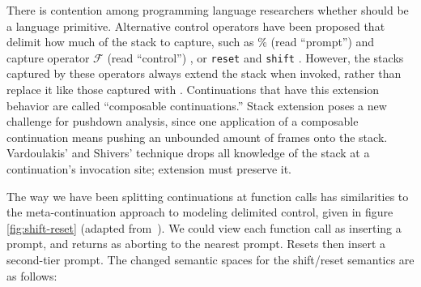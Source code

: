 There is contention among programming language researchers whether  should be a language primitive\citep{ianjohnson:kiselyov:against-callcc}.
%
Alternative control operators have been proposed that delimit how much of the stack to capture, such as $\%$ (read ``prompt'') and capture operator ${\mathcal F}$ (read ``control'') \citep{ianjohnson:felleisen:control:1988}, or \texttt{reset} and \texttt{shift} \citep{ianjohnson:danvy:filinski:delim:1990}.
%
However, the stacks captured by these operators always extend the stack when invoked, rather than replace it like those captured with .
%
Continuations that have this extension behavior are called ``composable continuations.''
%
Stack extension poses a new challenge for pushdown analysis, since one application of a composable continuation means pushing an unbounded amount of frames onto the stack.
%
Vardoulakis' and Shivers' technique drops all knowledge of the stack at a continuation's invocation site; extension must preserve it.

The way we have been splitting continuations at function calls has similarities to the meta-continuation approach to modeling delimited control, given in figure \ref{fig:shift-reset} (adapted from~\citep{ianjohnson:Biernacki2006274}).
%
We could view each function call as inserting a prompt, and returns as aborting to the nearest prompt.
%
Resets then insert a second-tier prompt.
%
The changed semantic spaces for the shift/reset semantics are as follows:


